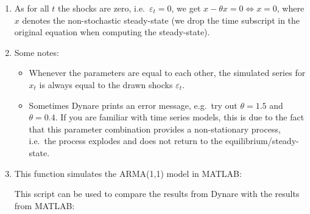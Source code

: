 \begin{enumerate}

\item
As for all \(t\) the shocks are zero, i.e.\
  \(\varepsilon_t = 0\), we get \(x - \theta x = 0 \Leftrightarrow x = 0\),
  where \(x\) denotes the non-stochastic steady-state
  (we drop the time subscript in the original equation when computing the steady-state).

\item


Some notes:

\begin{itemize}

\item
Whenever the parameters are equal to each other, the simulated series for \(x_t\) is always equal to the drawn shocks \(\varepsilon_t\).

\item
Sometimes Dynare prints an error message, e.g.\ try out \(\theta=1.5\) and \(\theta=0.4\).
If you are familiar with time series models, this is due to the fact that this parameter combination provides a non-stationary process,
  i.e.\ the process explodes and does not return to the equilibrium/steady-state.
\end{itemize}

\item
This function simulates the ARMA{(1,1)} model in MATLAB:\@

This script can be used to compare the results from Dynare with the results from MATLAB:\@


\end{enumerate}